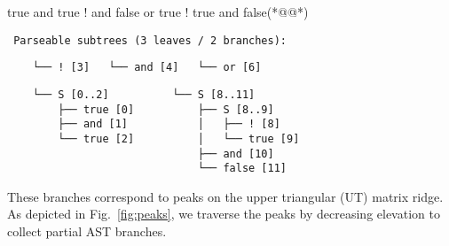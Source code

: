 \documentclass[sigplan,review,anonymous,acmsmall]{acmart}\settopmatter{printfolios=false,printccs=false,printacmref=false}
\begin{document}
    \begin{tidyinput}
        true and true ! and false or true ! true and false(*@\caret{ }@*)
    \end{tidyinput}

    \begin{verbatim}
 Parseable subtrees (3 leaves / 2 branches):
    \end{verbatim}
    \noindent\hspace{0.64cm}\hspace{1.70cm}\hspace{1.98cm}\vspace{-5pt}
    \begin{verbatim}
    └── ! [3]   └── and [4]   └── or [6]
    \end{verbatim}
    \hspace{0.63cm}\hspace{3.4cm}\vspace{-5pt}
    \begin{verbatim}
    └── S [0..2]          └── S [8..11]
        ├── true [0]          ├── S [8..9]
        ├── and [1]           │   ├── ! [8]
        └── true [2]          │   └── true [9]
                              ├── and [10]
                              └── false [11]
    \end{verbatim}

    \noindent These branches correspond to peaks on the upper triangular (UT) matrix ridge. As depicted in Fig.~\ref{fig:peaks}, we traverse the peaks by decreasing elevation to collect partial AST branches.
\end{document}
